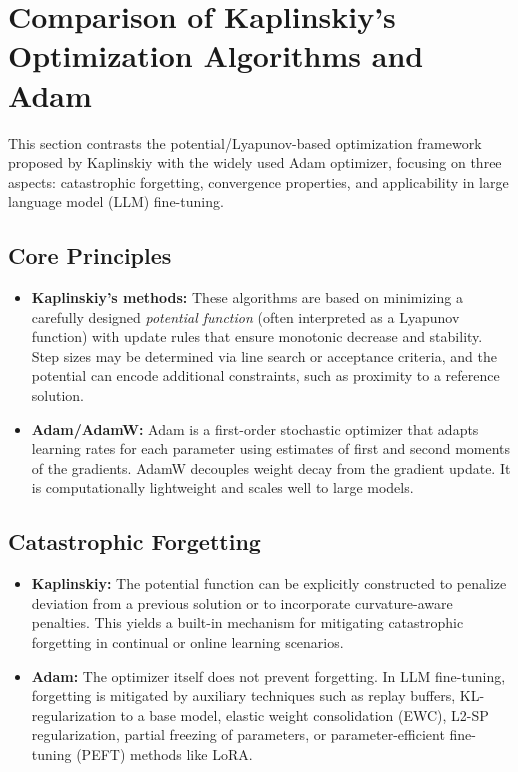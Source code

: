\documentclass[12pt]{article}
\begin{document}
\section{Comparison of Kaplinskiy’s Optimization Algorithms and Adam}

This section contrasts the potential/Lyapunov-based optimization framework proposed by Kaplinskiy with the widely used Adam optimizer, focusing on three aspects: catastrophic forgetting, convergence properties, and applicability in large language model (LLM) fine-tuning.

\subsection{Core Principles}
\begin{itemize}
    \item \textbf{Kaplinskiy’s methods:} These algorithms are based on minimizing a carefully designed \emph{potential function} (often interpreted as a Lyapunov function) with update rules that ensure monotonic decrease and stability. Step sizes may be determined via line search or acceptance criteria, and the potential can encode additional constraints, such as proximity to a reference solution.
    \item \textbf{Adam/AdamW:} Adam is a first-order stochastic optimizer that adapts learning rates for each parameter using estimates of first and second moments of the gradients. AdamW decouples weight decay from the gradient update. It is computationally lightweight and scales well to large models.
\end{itemize}

\subsection{Catastrophic Forgetting}
\begin{itemize}
    \item \textbf{Kaplinskiy:} The potential function can be explicitly constructed to penalize deviation from a previous solution or to incorporate curvature-aware penalties. This yields a built-in mechanism for mitigating catastrophic forgetting in continual or online learning scenarios.
    \item \textbf{Adam:} The optimizer itself does not prevent forgetting. In LLM fine-tuning, forgetting is mitigated by auxiliary techniques such as replay buffers, KL-regularization to a base model, elastic weight consolidation (EWC), L2-SP regularization, partial freezing of parameters, or parameter-efficient fine-tuning (PEFT) methods like LoRA.
\end{itemize}
\end{document}
